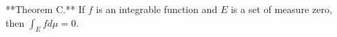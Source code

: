 **Theorem C.** If $f$ is an integrable function and $E$ is a set of measure zero, then $\int_E f d\mu = 0$.
